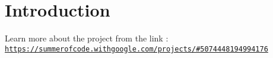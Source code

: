 \hypertarget{index_Introduction}{}\section{Introduction}\label{index_Introduction}
Learn more about the project from the link \+: \href{https://summerofcode.withgoogle.com/projects/#5074448194994176}{\tt https\+://summerofcode.\+withgoogle.\+com/projects/\#5074448194994176} 